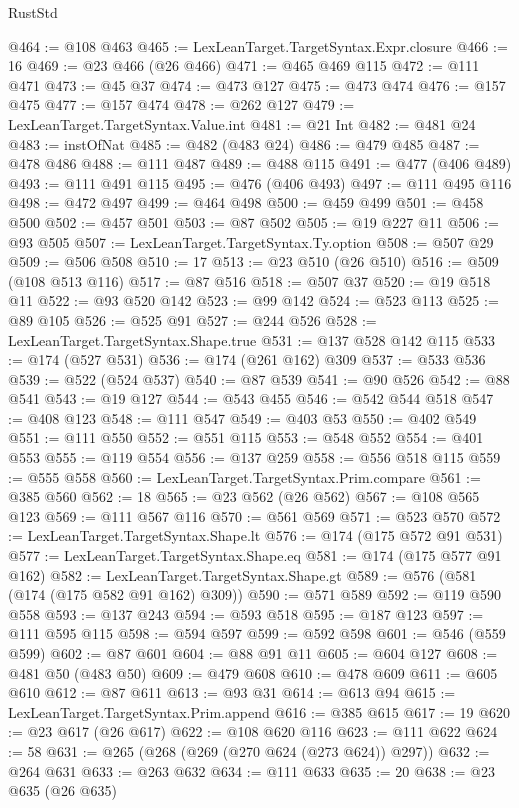 \begin{lexlean}{RustStd}
\begin{coremodule}
{\begin{coremodule}
{{{{{{{{{{{{{{{{{{{{{{{{{{{{{{{{{{{{{{{{{{{{{{{{{{{{{{{{{{{{{{{{{{{{{{{{{{{{{{@464 := @108 @463
@465 := LexLeanTarget.TargetSyntax.Expr.closure
@466 := 16
@469 := @23 @466 (@26 @466)
@471 := @465 @469 @115
@472 := @111 @471
@473 := @45 @37
@474 := @473 @127
@475 := @473 @474
@476 := @157 @475
@477 := @157 @474
@478 := @262 @127
@479 := LexLeanTarget.TargetSyntax.Value.int
@481 := @21 Int
@482 := @481 @24
@483 := instOfNat
@485 := @482 (@483 @24)
@486 := @479 @485
@487 := @478 @486
@488 := @111 @487
@489 := @488 @115
@491 := @477 (@406 @489)
@493 := @111 @491 @115
@495 := @476 (@406 @493)
@497 := @111 @495 @116
@498 := @472 @497
@499 := @464 @498
@500 := @459 @499
@501 := @458 @500
@502 := @457 @501
@503 := @87 @502
@505 := @19 @227 @11
@506 := @93 @505
@507 := LexLeanTarget.TargetSyntax.Ty.option
@508 := @507 @29
@509 := @506 @508
@510 := 17
@513 := @23 @510 (@26 @510)
@516 := @509 (@108 @513 @116)
@517 := @87 @516
@518 := @507 @37
@520 := @19 @518 @11
@522 := @93 @520 @142
@523 := @99 @142
@524 := @523 @113
@525 := @89 @105
@526 := @525 @91
@527 := @244 @526
@528 := LexLeanTarget.TargetSyntax.Shape.true
@531 := @137 @528 @142 @115
@533 := @174 (@527 @531)
@536 := @174 (@261 @162) @309
@537 := @533 @536
@539 := @522 (@524 @537)
@540 := @87 @539
@541 := @90 @526
@542 := @88 @541
@543 := @19 @127
@544 := @543 @455
@546 := @542 @544 @518
@547 := @408 @123
@548 := @111 @547
@549 := @403 @53
@550 := @402 @549
@551 := @111 @550
@552 := @551 @115
@553 := @548 @552
@554 := @401 @553
@555 := @119 @554
@556 := @137 @259
@558 := @556 @518 @115
@559 := @555 @558
@560 := LexLeanTarget.TargetSyntax.Prim.compare
@561 := @385 @560
@562 := 18
@565 := @23 @562 (@26 @562)
@567 := @108 @565 @123
@569 := @111 @567 @116
@570 := @561 @569
@571 := @523 @570
@572 := LexLeanTarget.TargetSyntax.Shape.lt
@576 := @174 (@175 @572 @91 @531)
@577 := LexLeanTarget.TargetSyntax.Shape.eq
@581 := @174 (@175 @577 @91 @162)
@582 := LexLeanTarget.TargetSyntax.Shape.gt
@589 := @576 (@581 (@174 (@175 @582 @91 @162) @309))
@590 := @571 @589
@592 := @119 @590 @558
@593 := @137 @243
@594 := @593 @518
@595 := @187 @123
@597 := @111 @595 @115
@598 := @594 @597
@599 := @592 @598
@601 := @546 (@559 @599)
@602 := @87 @601
@604 := @88 @91 @11
@605 := @604 @127
@608 := @481 @50 (@483 @50)
@609 := @479 @608
@610 := @478 @609
@611 := @605 @610
@612 := @87 @611
@613 := @93 @31
@614 := @613 @94
@615 := LexLeanTarget.TargetSyntax.Prim.append
@616 := @385 @615
@617 := 19
@620 := @23 @617 (@26 @617)
@622 := @108 @620 @116
@623 := @111 @622
@624 := 58
@631 := @265 (@268 (@269 (@270 @624 (@273 @624)) @297))
@632 := @264 @631
@633 := @263 @632
@634 := @111 @633
@635 := 20
@638 := @23 @635 (@26 @635)
}}}}}}}}}}}}}}}}}}}}}}}}}}}}}}}}}}}}}}}}}}}}}}}}}}}}}}}}}}}}}}}}}}}}}}}}}}}}}}
\end{coremodule}}
\end{coremodule}
\end{lexlean}

